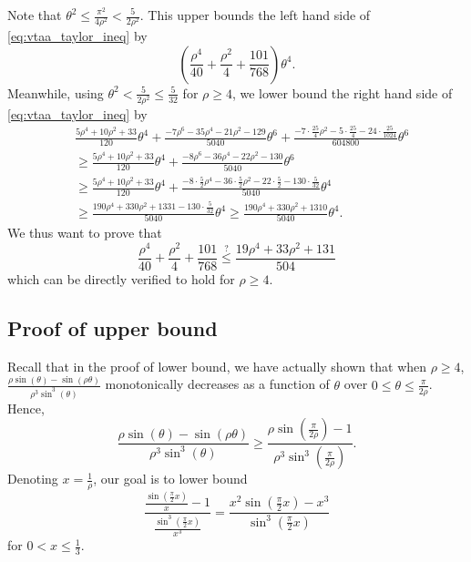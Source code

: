 \documentclass[letterpaper,onecolumn,11pt,accepted=2026-02-14]{quantumarticle}
\theoremstyle{remark}
\theoremstyle{plain}
\newcommand{\eq}[1]{\cref{eq:#1}}
\begin{document}
    Note that $\theta^2\leq\frac{\pi^2}{4\rho^2}<\frac{5}{2\rho^2}$.
    This upper bounds the left hand side of \eq{vtaa_taylor_ineq} by
    \begin{equation}
        \left(\frac{\rho^4}{40}+\frac{\rho^2}{4}+\frac{101}{768}\right)\theta^4.
    \end{equation}
    Meanwhile, using $\theta^2<\frac{5}{2\rho^2}\leq\frac{5}{32}$ for $\rho\geq 4$, we lower bound the right hand side of \eq{vtaa_taylor_ineq} by
    \begin{equation}
    \begin{aligned}
        &\frac{5\rho^4+10\rho^2+33}{120}\theta^4
        +\frac{-7\rho^6-35\rho^4-21\rho^2-129}{5040}\theta^6
        +\frac{-7\cdot\frac{25}{4}\rho^2-5\cdot\frac{25}{4}-24\cdot\frac{25}{1024}}{604800}\theta^{6}\\
        &\geq\frac{5\rho^4+10\rho^2+33}{120}\theta^4
        +\frac{-8\rho^6-36\rho^4-22\rho^2-130}{5040}\theta^6\\
        &\geq\frac{5\rho^4+10\rho^2+33}{120}\theta^4
        +\frac{-8\cdot\frac{5}{2}\rho^4-36\cdot\frac{5}{2}\rho^2-22\cdot\frac{5}{2}-130\cdot\frac{5}{32}}{5040}\theta^4\\
        &\geq\frac{190\rho^4+330\rho^2+1331-130\cdot\frac{5}{32}}{5040}\theta^4
        \geq\frac{190\rho^4+330\rho^2+1310}{5040}\theta^4.
    \end{aligned}
    \end{equation}
    We thus want to prove that
    \begin{equation}
        \frac{\rho^4}{40}+\frac{\rho^2}{4}+\frac{101}{768}
        \overset{?}{\leq}\frac{19\rho^4+33\rho^2+131}{504}
    \end{equation}
    which can be directly verified to hold for $\rho\geq4$.

\subsection{Proof of upper bound}
Recall that in the proof of lower bound, we have actually shown that when $\rho\geq 4$,
$\frac{\rho\sin(\theta)-\sin(\rho\theta)}{\rho^3\sin^3(\theta)}$
monotonically decreases as a function of $\theta$ over $0\leq\theta\leq\frac{\pi}{2\rho}$. Hence,
\begin{equation}
    \frac{\rho\sin(\theta)-\sin(\rho\theta)}{\rho^3\sin^3(\theta)}
    \geq\frac{\rho\sin\left(\frac{\pi}{2\rho}\right)-1}{\rho^3\sin^3\left(\frac{\pi}{2\rho}\right)}.
\end{equation}
Denoting $x=\frac{1}{\rho}$, our goal is to lower bound
\begin{equation}
    \frac{\frac{\sin\left(\frac{\pi}{2}x\right)}{x}-1}{\frac{\sin^3\left(\frac{\pi}{2}x\right)}{x^3}}=\frac{x^2\sin\left(\frac{\pi}{2}x\right)-x^3}{\sin^3\left(\frac{\pi}{2}x\right)}
\end{equation}
for $0<x\leq\frac{1}{3}$.
\end{document}
